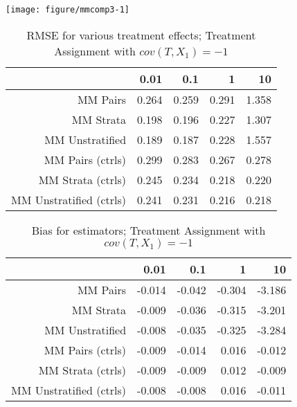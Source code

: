 \documentclass[11pt]{article}\usepackage[]{graphicx}\usepackage[]{color}
\makeatletter
\def\maxwidth{ %
  \ifdim\Gin@nat@width>\linewidth
    \linewidth
  \else
    \Gin@nat@width
  \fi
}
\newenvironment{knitrout}{}{} %
\makeatother
\begin{document}
\begin{knitrout}
\color{fgcolor}

{\centering \texttt{[image: figure/mmcomp3-1]} 

}



\end{knitrout}
\begin{table}[ht]
\centering
\begin{tabular}{rrrrr}
  \hline
 & 0.01 & 0.1 & 1 & 10 \\ 
  \hline
MM Pairs & 0.264 & 0.259 & 0.291 & 1.358 \\ 
  MM Strata & 0.198 & 0.196 & 0.227 & 1.307 \\ 
  MM Unstratified & 0.189 & 0.187 & 0.228 & 1.557 \\ 
  MM Pairs (ctrls) & 0.299 & 0.283 & 0.267 & 0.278 \\ 
  MM Strata (ctrls) & 0.245 & 0.234 & 0.218 & 0.220 \\ 
  MM Unstratified (ctrls) & 0.241 & 0.231 & 0.216 & 0.218 \\ 
   \hline
\end{tabular}
\caption{RMSE for various treatment effects; Treatment Assignment with $cov(T, X_1) = -1$} 
\label{tab:mmcomp3}
\end{table}
\begin{table}[ht]
\centering
\begin{tabular}{rrrrr}
  \hline
 & 0.01 & 0.1 & 1 & 10 \\ 
  \hline
MM Pairs & -0.014 & -0.042 & -0.304 & -3.186 \\ 
  MM Strata & -0.009 & -0.036 & -0.315 & -3.201 \\ 
  MM Unstratified & -0.008 & -0.035 & -0.325 & -3.284 \\ 
  MM Pairs (ctrls) & -0.009 & -0.014 & 0.016 & -0.012 \\ 
  MM Strata (ctrls) & -0.009 & -0.009 & 0.012 & -0.009 \\ 
  MM Unstratified (ctrls) & -0.008 & -0.008 & 0.016 & -0.011 \\ 
   \hline
\end{tabular}
\caption{Bias for estimators; Treatment Assignment with $cov(T, X_1) =-1$} 
\label{tab:mmcomp3}
\end{table}
\end{document}
